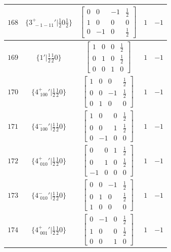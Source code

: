 \documentclass[fleqn,8pt]{jsarticle}
\begin{document}
\begin{longtable}{ccccc}
$ 168 $ & $ \{3^{+}_{\,\,-1-11}{}'|\frac{1}{2} 0 \frac{1}{2}\} $ & $ \begin{bmatrix} 0 & 0 & -1 & \frac{1}{2} \\ 1 & 0 & 0 & 0 \\ 0 & -1 & 0 & \frac{1}{2} \end{bmatrix} $ & $ 1 $ & $ -1 $ \\ \hline
$ 169 $ & $ \{1{}'|\frac{1}{2} \frac{1}{2} 0\} $ & $ \begin{bmatrix} 1 & 0 & 0 & \frac{1}{2} \\ 0 & 1 & 0 & \frac{1}{2} \\ 0 & 0 & 1 & 0 \end{bmatrix} $ & $ 1 $ & $ -1 $ \\ \hline
$ 170 $ & $ \{4^{+}_{\,\,100}{}'|\frac{1}{2} \frac{1}{2} 0\} $ & $ \begin{bmatrix} 1 & 0 & 0 & \frac{1}{2} \\ 0 & 0 & -1 & \frac{1}{2} \\ 0 & 1 & 0 & 0 \end{bmatrix} $ & $ 1 $ & $ -1 $ \\ \hline
$ 171 $ & $ \{4^{-}_{\,\,100}{}'|\frac{1}{2} \frac{1}{2} 0\} $ & $ \begin{bmatrix} 1 & 0 & 0 & \frac{1}{2} \\ 0 & 0 & 1 & \frac{1}{2} \\ 0 & -1 & 0 & 0 \end{bmatrix} $ & $ 1 $ & $ -1 $ \\ \hline
$ 172 $ & $ \{4^{+}_{\,\,010}{}'|\frac{1}{2} \frac{1}{2} 0\} $ & $ \begin{bmatrix} 0 & 0 & 1 & \frac{1}{2} \\ 0 & 1 & 0 & \frac{1}{2} \\ -1 & 0 & 0 & 0 \end{bmatrix} $ & $ 1 $ & $ -1 $ \\ \hline
$ 173 $ & $ \{4^{-}_{\,\,010}{}'|\frac{1}{2} \frac{1}{2} 0\} $ & $ \begin{bmatrix} 0 & 0 & -1 & \frac{1}{2} \\ 0 & 1 & 0 & \frac{1}{2} \\ 1 & 0 & 0 & 0 \end{bmatrix} $ & $ 1 $ & $ -1 $ \\ \hline
$ 174 $ & $ \{4^{+}_{\,\,001}{}'|\frac{1}{2} \frac{1}{2} 0\} $ & $ \begin{bmatrix} 0 & -1 & 0 & \frac{1}{2} \\ 1 & 0 & 0 & \frac{1}{2} \\ 0 & 0 & 1 & 0 \end{bmatrix} $ & $ 1 $ & $ -1 $ \\ \hline

\end{longtable}
\end{document}
